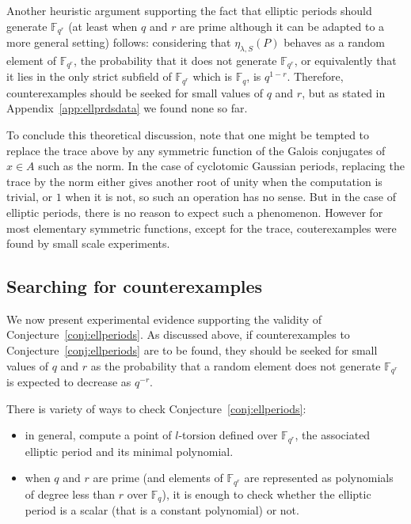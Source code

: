 \documentclass[12pt]{article}
\theoremstyle{plain}
\theoremstyle{definition}
\def\F{\ensuremath{\mathbb{F}}}
\begin{document}
Another heuristic argument supporting the fact that
elliptic periods should generate $\F_{q^r}$
(at least when $q$ and $r$ are prime although it can be adapted to
a more general setting) follows:
considering that $\eta_{\lambda, S}(P)$ behaves as a random
element of $\F_{q^r}$, the probability that it does not
generate $\F_{q^r}$, or equivalently that it lies in
the only strict subfield of $\F_{q^r}$ which is $\F_q$,
is $q^{1-r}$.
Therefore, counterexamples should be seeked for small values
of $q$ and $r$, but as stated in Appendix~\ref{app:ellprdsdata}
we found none so far.

To conclude this theoretical discussion, note that one might be tempted to
replace the trace above by any symmetric function of the
Galois conjugates of $x \in A$ such as the norm.
In the case of cyclotomic Gaussian periods,
replacing the trace by the norm either gives another root of unity
when the computation is trivial, or $1$ when it is not,
so such an operation has no sense.
But in the case of elliptic periods, there is no reason to expect such a
phenomenon.
However for most elementary symmetric functions, except for the trace,
couterexamples were found by small scale experiments.

\subsection{Searching for counterexamples}

We now present experimental evidence supporting the validity of
Conjecture~\ref{conj:ellperiods}.
As discussed above, if counterexamples to
Conjecture~\ref{conj:ellperiods} are to be found, they should be seeked
for small values of $q$ and $r$ as the probability that a random element
does not generate $\F_{q^r}$ is expected to decrease as $q^{-r}$.

There is variety of ways to check Conjecture~\ref{conj:ellperiods}:
\begin{itemize}
\item in general, compute a point of $l$-torsion defined
over $\F_{q^r}$, the associated elliptic period and its minimal polynomial.
\item when $q$ and $r$ are prime (and elements of $\F_{q^r}$ are represented
as polynomials of degree less than $r$ over $\F_{q}$), it is enough to
check whether the elliptic period is a scalar (that is a constant polynomial)
or not.
\end{itemize}
\end{document}
